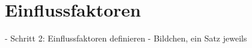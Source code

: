 \section{Einflussfaktoren}

	- Schritt 2: Einflussfaktoren definieren
		- Bildchen, ein Satz jeweils